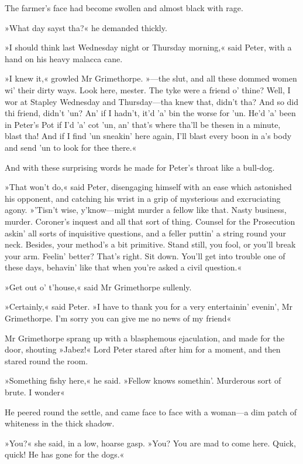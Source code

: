The farmer's face had become swollen and almost black with rage.

»What day sayst tha?« he demanded thickly.

»I should think last Wednesday night or Thursday morning,« said Peter, with a hand on his heavy malacca cane.

»I knew it,« growled Mr Grimethorpe. »---the slut, and all these dommed women wi' their dirty ways. Look here, mester. The tyke were a friend o' thine? Well, I wor at Stapley Wednesday and Thursday\allowbreak---\allowbreak tha knew that, didn't tha? And so did thi friend, didn't 'un? An' if I hadn't, it'd 'a' bin the worse for 'un. He'd 'a' been in Peter's Pot if I'd 'a' cot 'un, an' that's where tha'll be thesen in a minute, blast tha! And if I find 'un sneakin' here again, I'll blast every boon in a's body and send 'un to look for thee there.«

And with these surprising words he made for Peter's throat like a bull-dog.

»That won't do,« said Peter, disengaging himself with an ease which astonished his opponent, and catching his wrist in a grip of mysterious and excruciating agony. »'Tisn't wise, y'know\allowbreak---\allowbreak might murder a fellow like that. Nasty business, murder. Coroner's inquest and all that sort of thing. Counsel for the Prosecution askin' all sorts of inquisitive questions, and a feller puttin' a string round your neck. Besides, your method's a bit primitive. Stand still, you fool, or you'll break your arm. Feelin' better? That's right. Sit down. You'll get into trouble one of these days, behavin' like that when you're asked a civil question.«

»Get out o' t'house,« said Mr Grimethorpe sullenly.

»Certainly,« said Peter. »I have to thank you for a very entertainin' evenin', Mr Grimethorpe. I'm sorry you can give me no news of my friend\longdash«

Mr Grimethorpe sprang up with a blasphemous ejaculation, and made for the door, shouting »Jabez!« Lord Peter stared after him for a moment, and then stared round the room.

»Something fishy here,« he said. »Fellow knows somethin'. Murderous sort of brute. I wonder\longdash«

He peered round the settle, and came face to face with a woman\allowbreak---\allowbreak a dim patch of whiteness in the thick shadow.

»You?« she said, in a low, hoarse gasp. »You? You are mad to come here.  Quick, quick! He has gone for the dogs.«

